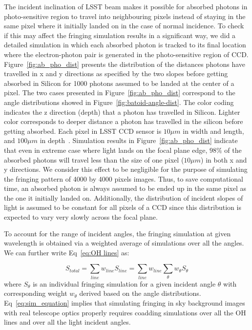 \documentclass[twocolumn]{aastex63} %
\begin{document}
\begin{CJK*}{UTF8}{gbsn}
The incident inclination of LSST beam makes it possible for absorbed photons in photo-sensitive region to travel into neighbouring pixels instead of staying in the same pixel where it initially landed on in the case of normal incidence. To check if this may affect the fringing simulation results in a significant way, we did a detailed simulation in which each absorbed photon is tracked to its final location where the electron-photon pair is generated in the photo-sensitive region of CCD. Figure~\ref{fig:ab_pho_dist} presents the distribution of the distances photons have travelled in x and y directions as specified by the two slopes before getting absorbed in Silicon for 1000 photons assumed to be landed at the center of a pixel.  The two cases presented in Figure~\ref{fig:ab_pho_dist} correspond to the angle distributions showed in Figure~\ref{fig:batoid-angle-dist}. The color coding indicates the z direction (depth) that a photon has travelled in Silicon. Lighter color corresponds to deeper distance a photon has travelled in the silicon before getting absorbed. Each pixel in LSST CCD sensor is $10\mu m$ in width and length, and $100\mu m$ in depth~\citep{Ivezi19}. Simulation results in Figure~\ref{fig:ab_pho_dist} indicate that even in extreme case where light lands on the focal plane edge, $98\%$ of the absorbed photons will travel less than the size of one pixel ($10 \mu m$) in both x and y directions. We consider this effect to be negligible for the purpose of simulating the fringing pattern of 4000 by 4000 pixels images. Thus, to save computational time, an absorbed photon is always assumed to be ended up in the same pixel as the one it initially landed on. Additionally, the distribution of incident slopes of light is assumed to be constant for all pixels of a CCD since this distribution is expected to vary very slowly across the focal plane.

To account for the range of incident angles, the fringing simulation at given wavelength is obtained via a weighted average of simulations over all the angles. We can further write Eq~\ref{eq:OH lines} as:

\begin{equation} \label{eq:sim_equation}
    S_{total} = \sum_{line}w_{line} S_{line} = \sum_{line}w_{line}\sum_{\theta}w_{\theta}S_{\theta}
\end{equation}
where $S_\theta$ is an individual fringing simulation for a given incident angle $\theta$ with corresponding weight $w_\theta$ derived based on the angle distributions.  Eq~\ref{eq:sim_equation} implies that simulating fringing in sky background images with real telescope optics properly requires coadding simulations over all the OH lines and over all the light incident angles.


\end{CJK*}
\end{document}
